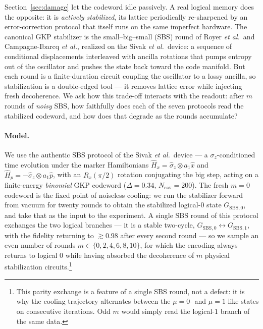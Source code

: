 \documentclass[11pt]{article}
\begin{document}
Section~\ref{sec:damage} let the codeword idle passively. A real logical memory does the
opposite: it is \emph{actively stabilized}, its lattice periodically re-sharpened by an
error-correction protocol that itself runs on the same imperfect hardware. The canonical GKP
stabilizer is the small--big--small (SBS) round of Royer \emph{et al.}\ and
Campagne-Ibarcq \emph{et al.}, realized on the Sivak \emph{et al.}\ device: a sequence of
conditional displacements interleaved with ancilla rotations that pumps entropy out of the
oscillator and pushes the state back toward the code manifold. But each round is a finite-duration
circuit coupling the oscillator to a lossy ancilla, so stabilization is a double-edged tool ---
it removes lattice error while injecting fresh decoherence. We ask how this trade-off interacts
with the readout: after $m$ rounds of \emph{noisy} SBS, how faithfully does each of the seven
protocols read the stabilized codeword, and how does that degrade as the rounds accumulate?

\paragraph{Model.} We use the authentic SBS protocol of the Sivak \emph{et al.}\
device --- a $\sigma_z$-conditioned time evolution under the marker Hamiltonians
$\hat H_x=\hat\sigma_z\otimes a_1\hat x$ and $\hat H_p=-\hat\sigma_z\otimes a_1\hat p$, with an
$R_x(\pi/2)$ rotation conjugating the big step, acting on a finite-energy \emph{binomial} GKP
codeword ($\Delta=0.34$, $N_{\mathrm{cav}}=200$). The fresh $m=0$ codeword is the fixed point of
noiseless cooling: we run the stabilizer forward from vacuum for twenty rounds to obtain the
stabilized logical-$0$ state $G_{\mathrm{SBS},0}$, and take that as the input to the experiment.
A single SBS round of this protocol exchanges the two logical branches --- it is a stable
two-cycle, $G_{\mathrm{SBS},0}\!\leftrightarrow\!G_{\mathrm{SBS},1}$, with the fidelity returning
to $\gtrsim0.98$ after every second round --- so we sample an even number of rounds
$m\in\{0,2,4,6,8,10\}$, for which the encoding always returns to logical $0$ while having absorbed
the decoherence of $m$ physical stabilization circuits.\footnote{This parity exchange is a feature
of a single SBS round, not a defect: it is why the cooling trajectory alternates between the
$\mu=0$- and $\mu=1$-like states on consecutive iterations. Odd $m$ would simply read the
logical-$1$ branch of the same data.}
\end{document}
